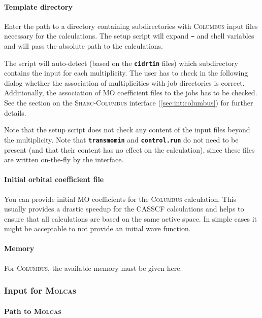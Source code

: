 \documentclass[a4paper,10pt,DIV=15,openany,twoside=false]{scrbook}
\newcommand{\sharc}{\textsc{Sharc}}
\newcommand{\ttt}[1]{\textbf{\texttt{#1}}}
\begin{document}
\paragraph{Template directory}

Enter the path to a directory containing subdirectories with \textsc{Columbus} input files necessary for the calculations. The setup script will expand \ttt{\textasciitilde} and shell variables and will pass the absolute path to the calculations.

The script will auto-detect (based on the \ttt{cidrtin} files) which subdirectory contains the input for each multiplicity. The user has to check in the following dialog whether the association of multiplicities with job directories is correct. Additionally, the association of MO coefficient files to the jobs has to be checked. See the section on the \sharc-\textsc{Columbus} interface (\ref{sec:int:columbus}) for further details. 

Note that the setup script does not check any content of the input files beyond the multiplicity. Note that \ttt{transmomin} and \ttt{control.run} do not need to be present (and that their content has no effect on the calculation), since these files are written on-the-fly by the interface. 

\paragraph{Initial orbital coefficient file}

You can provide initial MO coefficients for the \textsc{Columbus} calculation. This usually provides a drastic speedup for the CASSCF calculations and helps to ensure that all calculations are based on the same active space. In simple cases it might be acceptable to not provide an initial wave function.

\paragraph{Memory}

For \textsc{Columbus}, the available memory must be given here. 



\subsubsection{Input for \textsc{Molcas}}

\paragraph{Path to \textsc{Molcas}}
\end{document}

